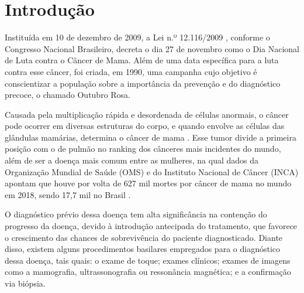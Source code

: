 \section{\esp Introdução}

Instituída em 10 de dezembro de 2009, a Lei n.º 12.116/2009 , conforme o Congresso Nacional Brasileiro, decreta o dia 27 de novembro como o Dia Nacional de Luta contra o Câncer de Mama. Além de uma data específica para a luta contra esse câncer, foi criada, em 1990, uma campanha cujo objetivo é conscientizar a população sobre a importância da prevenção e do diagnóstico precoce, o chamado Outubro Rosa.

Causada pela multiplicação rápida e desordenada de células anormais, o câncer pode ocorrer em diversas estruturas do corpo, e quando envolve as células das glândulas mamárias, determina o câncer de mama \cite{incaoquee}. Esse tumor divide a primeira posição com o de pulmão no ranking dos cânceres mais incidentes do mundo, além de ser a doença mais comum entre as mulheres, na qual dados da Organização Mundial de Saúde (OMS) e do Instituto Nacional de Câncer (INCA) apontam que houve por volta de 627 mil mortes por câncer de mama no mundo em 2018, sendo 17,7 mil no Brasil \cite{boletimepidemiologico}.

O diagnóstico prévio dessa doença tem alta significância na contenção do progresso da doença, devido à introdução antecipada do tratamento, que favorece o crescimento das chances de sobrevivência do paciente diagnosticado. Diante disso, existem alguns procedimentos basilares empregados para o diagnóstico dessa doença, tais quais: o exame de toque; exames clínicos; exames de imagens como a mamografia, ultrassonografia ou ressonância magnética; e a confirmação via biópsia.


